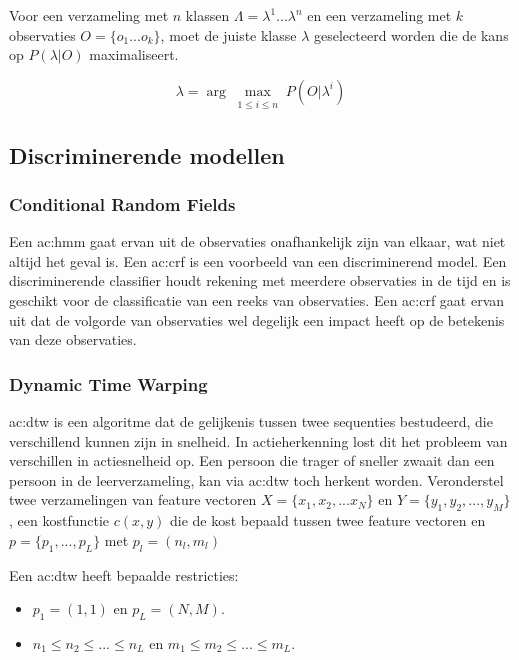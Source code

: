 Voor een verzameling met $n$ klassen $\Lambda = \lambda^1 ... \lambda^n$ en een verzameling met $k$ observaties $O = \{o_1 ... o_k\}$, moet de juiste klasse $\lambda$ geselecteerd worden die de kans op $P(\lambda | O)$ maximaliseert.

$$\lambda = \arg\max_{\substack{1 \leq i \leq n}} P(O|\lambda^i) $$


\subsection{Discriminerende modellen}
\subsubsection{Conditional Random Fields}
Een \gls{ac:hmm} gaat ervan uit de observaties onafhankelijk zijn van elkaar, wat niet altijd het geval is. Een \gls{ac:crf} is een voorbeeld van een discriminerend model. Een discriminerende classifier houdt rekening met meerdere observaties in de tijd en is geschikt voor de classificatie van een reeks van observaties. Een \gls{ac:crf} gaat ervan uit dat de volgorde van observaties wel degelijk een impact heeft op de betekenis van deze observaties.

\subsubsection{Dynamic Time Warping}
\gls{ac:dtw} is een algoritme dat de gelijkenis tussen twee sequenties bestudeerd, die verschillend kunnen zijn in snelheid. In actieherkenning lost dit het probleem van verschillen in actiesnelheid op. Een persoon die trager of sneller zwaait dan een persoon in de leerverzameling, kan via \gls{ac:dtw} toch herkent worden. Veronderstel twee verzamelingen van feature vectoren $X = \{x_1, x_2, ... x_N\}$ en $Y = \{y_1, y_2, ..., y_M\}$, een kostfunctie $c(x, y)$ die de kost bepaald tussen twee feature vectoren en $p = \{p_1, ..., p_L\}$ met $p_l = (n_l, m_l)$  

Een \gls{ac:dtw} heeft bepaalde restricties:
\begin{itemize}
	\item $p_1 = (1, 1)$ en $p_L = (N, M)$.
	\item $n_1 \leq n_2 \leq ... \leq n_L$ en $m_1 \leq m_2 \leq ... \leq m_L$.
\end{itemize}


